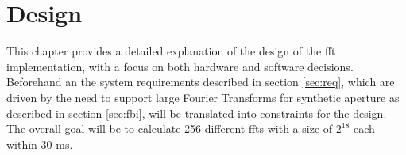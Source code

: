 \chapter{Design}\label{ch:design}


This chapter provides a detailed explanation of the design of the \ac{fft} implementation, with a focus on both hardware and software decisions. Beforehand an the system requirements described in section \ref{sec:req}, which are driven by the need to support large Fourier Transforms for synthetic aperture as described in section \ref{sec:fbi}, will be translated into constraints for the design. The overall goal will be to calculate 256 different \ac{fft}s with a size of $2^{18}$ each within 30 ms.

